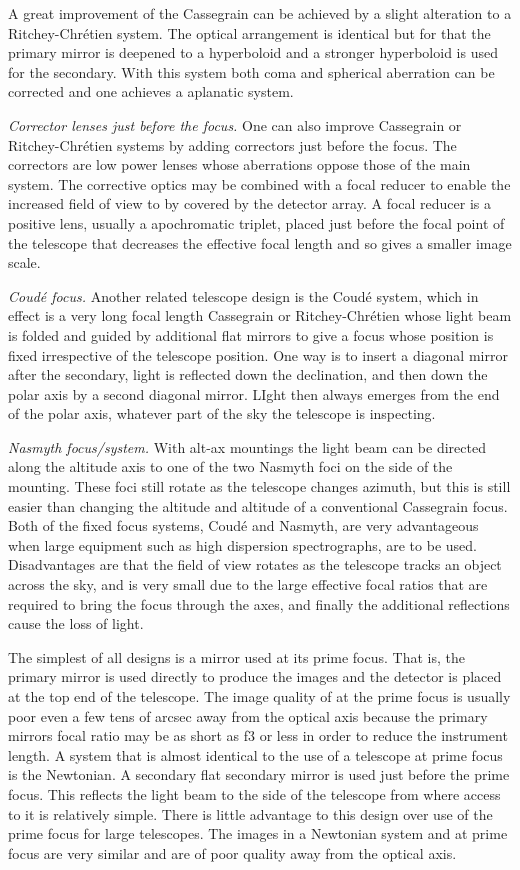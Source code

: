 A great improvement of the Cassegrain can be achieved by a slight alteration
to a Ritchey-Chr{\'e}tien system. The optical arrangement is identical but for
that the primary mirror is deepened to a hyperboloid and a stronger 
hyperboloid is used for the secondary. With this system both coma and 
spherical aberration can be corrected and one achieves a aplanatic system. 

\noindent
{\it Corrector lenses just before the focus.} One can also improve Cassegrain
or Ritchey-Chr\'etien systems by adding correctors just before the focus. 
The correctors are low power lenses whose aberrations oppose those of the main
system. The corrective optics may be combined with a focal reducer to enable 
the increased field of view to by covered by the detector array. A focal reducer
is a positive lens, usually a apochromatic triplet, placed just before the focal 
point of the telescope that decreases the effective focal length and so gives 
a smaller image scale.

{\it Coud\'e focus.} Another related telescope design is the Coud{\'e} system, which in effect
is a very long focal length Cassegrain or Ritchey-Chr{\'e}tien whose light 
beam is folded and guided by additional flat mirrors to give a focus whose
position is fixed irrespective of the telescope position. One way is to insert a 
diagonal mirror after the secondary, light is reflected down the declination, and 
then down the polar axis by a second diagonal mirror. LIght then always emerges
from the end of the polar axis, whatever part of the sky the telescope is inspecting.

\noindent
{\it Nasmyth focus/system.} With alt-ax mountings the light beam can be directed
along the altitude axis to one of the two Nasmyth foci on the side of the mounting.
These foci still rotate as the telescope changes azimuth, but this is still easier than 
changing the altitude and altitude of a conventional Cassegrain focus. Both of the
fixed focus systems, Coud\'e and Nasmyth, are very advantageous when large equipment
such as high dispersion spectrographs, are to be used. Disadvantages are that the
field of view rotates as the telescope tracks an object across the sky, and is very 
small due to the large effective focal ratios that are required to bring the focus 
through the axes, and finally the additional reflections cause the loss of light.

The simplest of all designs is a mirror used at its prime focus. That is, 
the primary mirror is used directly to produce the images and the detector
is placed at the top end of the telescope. The image quality of at the prime
focus is usually poor even a few tens of arcsec away from the optical axis
because the primary mirrors focal ratio may be as short as f3 or less in
order to reduce the instrument length. A system that is almost identical
to the use of a telescope at prime focus is the Newtonian. A secondary 
flat secondary mirror is used just before the prime focus. This reflects the
light beam to the side of the telescope from where access to it is relatively
simple. There is little advantage to this design over use of the prime focus
for large telescopes. The images in a Newtonian system and at prime focus 
are very similar and are of poor quality away from the optical axis.

